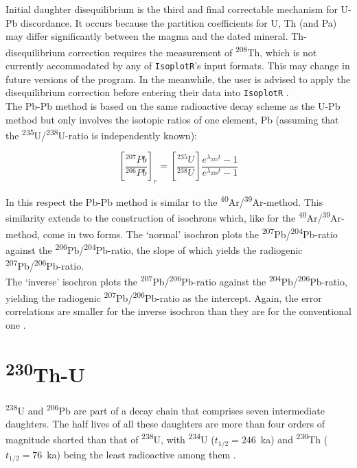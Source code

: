 \documentclass{article}
\begin{document}
Initial daughter disequilibrium is the third and final correctable
mechanism for U-Pb discordance. It occurs because the partition
coefficients for U, Th (and Pa) may differ significantly between the
magma and the dated mineral. Th-disequilibrium correction requires the
measurement of \textsuperscript{208}Th, which is not currently
accommodated by any of \texttt{IsoplotR}'s input formats. This may
change in future versions of the program. In the meanwhile, the user
is advised to apply the disequilibrium correction before entering
their data into \texttt{IsoplotR} \citep{mclean2011}.\\

The Pb-Pb method is based on the same radioactive decay scheme as the
U-Pb method but only involves the isotopic ratios of one element, Pb
(assuming that the \textsuperscript{235}U/\textsuperscript{238}U-ratio
is independently known):

\begin{equation*}
  \left[\frac{{}^{207}Pb}{{}^{206}Pb}\right]_r =
  \left[\frac{{}^{235}U}{{}^{238}U}\right]
  \frac{e{}^{\lambda_{235}t}-1}{e{}^{\lambda_{238}t}-1}
\end{equation*}

In this respect the Pb-Pb method is similar to the
\textsuperscript{40}Ar/\textsuperscript{39}Ar-method.  This similarity
extends to the construction of isochrons which, like for the
\textsuperscript{40}Ar/\textsuperscript{39}Ar-method, come in two
forms. The `normal' isochron plots the
\textsuperscript{207}Pb/\textsuperscript{204}Pb-ratio against the
\textsuperscript{206}Pb/\textsuperscript{204}Pb-ratio, the slope of
which yields the radiogenic
\textsuperscript{207}Pb/\textsuperscript{206}Pb-ratio.\\

The `inverse' isochron plots the
\textsuperscript{207}Pb/\textsuperscript{206}Pb-ratio against the
\textsuperscript{204}Pb/\textsuperscript{206}Pb-ratio, yielding the
radiogenic \textsuperscript{207}Pb/\textsuperscript{206}Pb-ratio as
the intercept. Again, the error correlations are smaller for the
inverse isochron than they are for the conventional one
\citep{connelly2017}.

\section{\textsuperscript{230}Th-U}
\label{sec:ThU}

\textsuperscript{238}U and \textsuperscript{206}Pb are part of a decay
chain that comprises seven intermediate daughters. The half lives of
all these daughters are more than four orders of magnitude shorted
than that of \textsuperscript{238}U, with \textsuperscript{234}U
($t_{1/2} = 246$~ka) and \textsuperscript{230}Th ($t_{1/2} = 76$~ka)
being the least radioactive among them \citep{cheng2013}.\\
\end{document}
